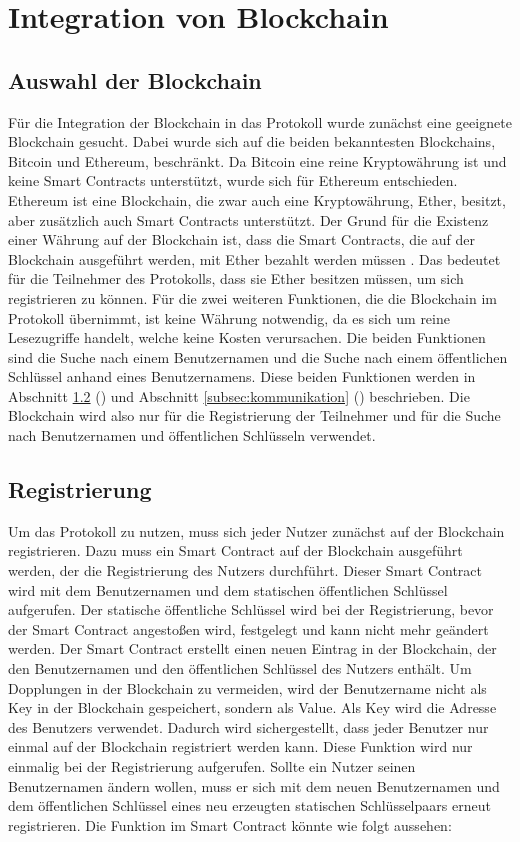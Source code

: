\section{Integration von Blockchain}
\label{sec:blockchainintegration}


\subsection{Auswahl der Blockchain}
Für die Integration der Blockchain in das Protokoll wurde zunächst eine geeignete Blockchain gesucht. Dabei wurde sich auf die beiden bekanntesten Blockchains, Bitcoin und Ethereum, beschränkt. Da Bitcoin eine reine Kryptowährung ist und keine Smart Contracts unterstützt, wurde sich für Ethereum entschieden. Ethereum ist eine Blockchain, die zwar auch eine Kryptowährung, Ether, besitzt, aber zusätzlich auch Smart Contracts unterstützt. Der Grund für die Existenz einer Währung auf der Blockchain ist, dass die Smart Contracts, die auf der Blockchain ausgeführt werden, mit Ether bezahlt werden müssen \parencite[S. 2]{Antonopoulos_MasteringEthereum}. Das bedeutet für die Teilnehmer des Protokolls, dass sie Ether besitzen müssen, um sich registrieren zu können. Für die zwei weiteren Funktionen, die die Blockchain im Protokoll übernimmt, ist keine Währung notwendig, da es sich um reine Lesezugriffe handelt, welche keine Kosten verursachen. Die beiden Funktionen sind die Suche nach einem Benutzernamen und die Suche nach einem öffentlichen Schlüssel anhand eines Benutzernamens. Diese beiden Funktionen werden in Abschnitt \ref{subsec:registrierung} () und Abschnitt \ref{subsec:kommunikation} () beschrieben. Die Blockchain wird also nur für die Registrierung der Teilnehmer und für die Suche nach Benutzernamen und öffentlichen Schlüsseln verwendet.


\subsection{Registrierung}
\label{subsec:registrierung}
Um das Protokoll zu nutzen, muss sich jeder Nutzer zunächst auf der Blockchain registrieren. Dazu muss ein Smart Contract auf der Blockchain ausgeführt werden, der die Registrierung des Nutzers durchführt. Dieser Smart Contract wird mit dem Benutzernamen und dem statischen öffentlichen Schlüssel aufgerufen. Der statische öffentliche Schlüssel wird bei der Registrierung, bevor der Smart Contract angestoßen wird, festgelegt und kann nicht mehr geändert werden. Der Smart Contract erstellt einen neuen Eintrag in der Blockchain, der den Benutzernamen und den öffentlichen Schlüssel des Nutzers enthält. Um Dopplungen in der Blockchain zu vermeiden, wird der Benutzername nicht als Key in der Blockchain gespeichert, sondern als Value. Als Key wird die Adresse des Benutzers verwendet. Dadurch wird sichergestellt, dass jeder Benutzer nur einmal auf der Blockchain registriert werden kann. Diese Funktion wird nur einmalig bei der Registrierung aufgerufen. Sollte ein Nutzer seinen Benutzernamen ändern wollen, muss er sich mit dem neuen Benutzernamen und dem öffentlichen Schlüssel eines neu erzeugten statischen Schlüsselpaars erneut registrieren. Die Funktion im Smart Contract könnte wie folgt aussehen:

